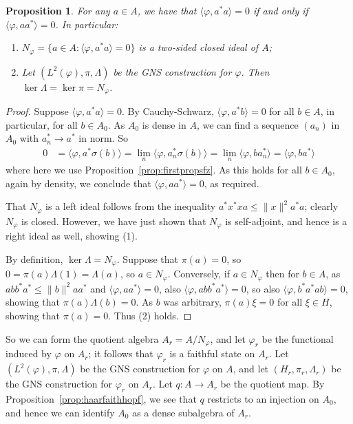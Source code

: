 \documentclass[twoside,a4paper,12pt]{article}
\theoremstyle{plain}
\newtheorem{proposition}{Proposition}[section]
\theoremstyle{definition}
\newcommand{\ip}[2]{\langle #1,#2 \rangle}
\begin{document}
\begin{proposition}
For any $a\in A$, we have that $\ip{\varphi}{a^*a}=0$ if and only if
$\ip{\varphi}{aa^*}=0$.  In particular:
\begin{enumerate}
\item $N_\varphi = \{a\in A : \ip{\varphi}{a^*a}=0 \}$ is a two-sided closed
  ideal of $A$;
\item Let $(L^2(\varphi),\pi,\Lambda)$ be the GNS construction for $\varphi$.
  Then $\ker\Lambda = \ker\pi = N_\varphi$.
\end{enumerate}
\end{proposition}
\begin{proof}
Suppose $\ip{\varphi}{a^*a}=0$.  By Cauchy-Schwarz, $\ip{\varphi}{a^*b}=0$
for all $b\in A$, in particular, for all $b\in A_0$.  As $A_0$ is dense
in $A$, we can find a sequence $(a_n)$ in $A_0$ with $a_n^*\rightarrow a^*$
in norm.  So
\begin{align*}
0 &= \ip{\varphi}{a^*\sigma(b)} = \lim_n \ip{\varphi}{a_n^*\sigma(b)}
= \lim_n \ip{\varphi}{ba_n^*} = \ip{\varphi}{ba^*}
\end{align*}
where here we use Proposition~\ref{prop:firstpropsfz}.  As this holds for
all $b\in A_0$, again by density, we conclude that $\ip{\varphi}{aa^*}=0$,
as required.

That $N_\varphi$ is a left ideal follows from the inequality
$a^* x^*x a \leq \|x\|^2 a^*a$; clearly $N_\varphi$ is closed.  However,
we have just shown that $N_\varphi$ is self-adjoint, and hence is a
right ideal as well, showing (1).

By definition,
$\ker\Lambda = N_\varphi$.  Suppose that $\pi(a)=0$, so $0 = \pi(a)\Lambda(1)
= \Lambda(a)$, so $a\in N_\varphi$.  Conversely, if $a\in N_\varphi$ then
for $b\in A$, as $abb^*a^* \leq \|b\|^2 aa^*$ and $\ip{\varphi}{aa^*}=0$,
also $\ip{\varphi}{abb^*a^*}=0$, so also $\ip{\varphi}{b^*a^*ab}=0$, showing
that $\pi(a)\Lambda(b)=0$.  As $b$ was arbitrary, $\pi(a)\xi=0$ for all
$\xi\in H$, showing that $\pi(a)=0$.  Thus (2) holds.
\end{proof}

So we can form the quotient algebra $A_r = A/N_\varphi$, and let
$\varphi_r$ be the functional induced by $\varphi$ on $A_r$; it follows that
$\varphi_r$ is a faithful state on $A_r$.  Let $(L^2(\varphi),\pi,\Lambda)$ be
the GNS construction for $\varphi$ on $A$, and let $(H_r,\pi_r,\Lambda_r)$ be
the GNS construction for $\varphi_r$ on $A_r$.  Let $q:A\rightarrow A_r$
be the quotient map.  By Proposition~\ref{prop:haarfaithhopf}, we see that
$q$ restricts to an injection on $A_0$, and hence we can identify $A_0$
as a dense subalgebra of $A_r$.
\end{document}
